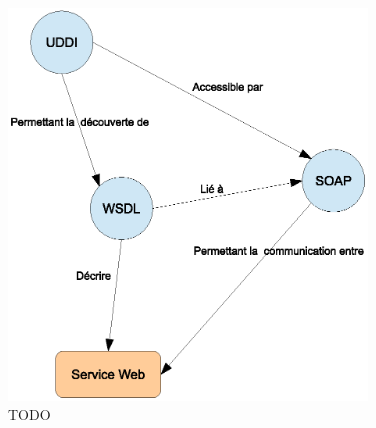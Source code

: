 \begin{figure}[h]
    \centering
    \includegraphics[width=0.85\textwidth]{figs/ws-standards-relationships.eps}
    \caption{TODO \cite{erl2004service}}
    \label{fig:ws-standards-relationships}
\end{figure}

